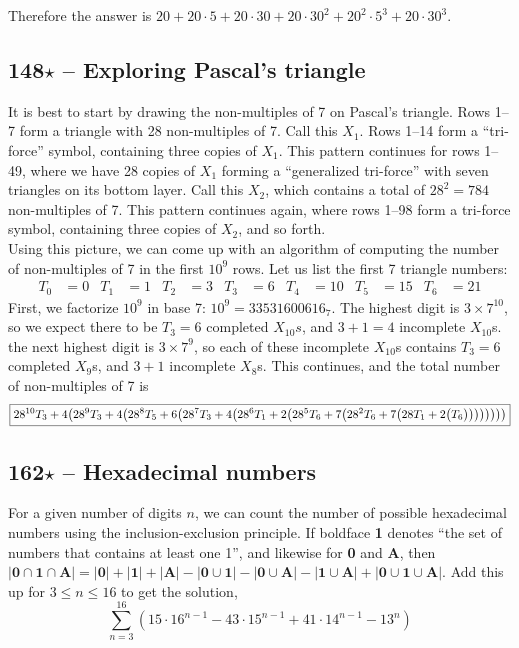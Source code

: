 \documentclass{article}
\begin{document}
Therefore the answer is $\boxed{20 + 20\cdot 5 + 20 \cdot 30 + 20 \cdot 30^2 + 20^2 \cdot 5^3 + 20 \cdot 30^3}$.

\subsection*{148$\star$ -- Exploring Pascal's triangle}
It is best to start by drawing the non-multiples of 7 on Pascal's triangle.
Rows 1--7 form a triangle with 28 non-multiples of 7.
Call this $X_1$.
Rows 1--14 form a ``tri-force'' symbol, containing three copies of $X_1$.
This pattern continues for rows 1--49, where we have 28 copies of $X_1$ forming a ``generalized tri-force'' with seven triangles on its bottom layer.
Call this $X_2$, which contains a total of $28^2 = 784$ non-multiples of 7.
This pattern continues again, where rows 1--98 form a tri-force symbol, containing three copies of $X_2$, and so forth. \\

Using this picture, we can come up with an algorithm of computing the number of non-multiples of 7 in the first $10^9$ rows.
Let us list the first 7 triangle numbers:
\begin{align*}
T_0 &= 0 & T_1 &= 1 & T_2 &= 3 & T_3 &= 6 & T_4 &= 10 & T_5 &= 15 & T_6 &= 21
\end{align*}
First, we factorize $10^9$ in base 7: $10^9 = 33531600616_7$.
The highest digit is $3 \times 7^{10}$, so we expect there to be $T_3 = 6$ completed $X_{10}s$, and $3+1 = 4$ incomplete $X_{10}$s.
the next highest digit is $3 \times 7^9$, so each of these incomplete $X_{10}$s contains $T_3 = 6$ completed $X_9$s, and $3+1$ incomplete $X_8$s.
This continues, and the total number of non-multiples of 7 is
\[ \boxed{ 28^{10} T_3 + 4 \qty( 28^9 T_3 + 4 \qty( 28^8 T_5 + 6 \qty( 28^7 T_3 + 4 \qty( 28^6 T_1 + 2 \qty( 28^5 T_6 + 7 \qty( 28^2 T_6 + 7 \qty\big( 28 T_1 + 2 \qty\big( T_6 )))))))) } \]


\subsection*{162$\star$ -- Hexadecimal numbers} 
For a given number of digits $n$, we can count the number of possible hexadecimal numbers using the inclusion-exclusion principle. 
If boldface \textbf{1} denotes ``the set of numbers that contains at least one 1'', and likewise for \textbf{0} and \textbf{A}, then $|\mathbf{0} \cap \mathbf{1} \cap \mathbf{A}| = |\mathbf{0}| + |\mathbf{1}| + |\mathbf{A}| - |\mathbf{0} \cup \mathbf{1}| - |\mathbf{0} \cup \mathbf{A}| - |\mathbf{1} \cup \mathbf{A}| + |\mathbf{0} \cup \mathbf{1} \cup \mathbf{A}|$.
Add this up for $3 \leq n \leq 16$ to get the solution, 
\[ \boxed{ \sum_{n=3}^{16} \left(15 \cdot 16^{n-1} - 43 \cdot 15^{n-1} + 41 \cdot 14^{n-1} - 13^n\right) } \]
\end{document}
